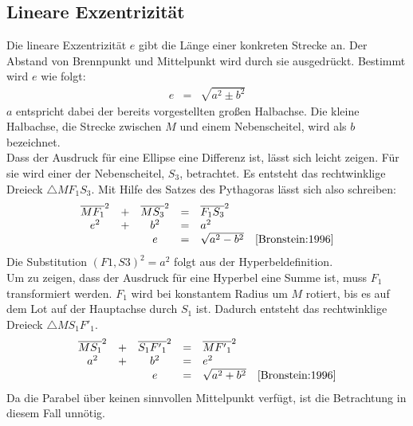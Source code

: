 \subsection{Lineare Exzentrizität}
Die lineare Exzentrizität $e$ gibt die Länge einer konkreten Strecke an. Der Abstand von Brennpunkt und Mittelpunkt wird durch sie ausgedrückt. Bestimmt wird $e$ wie folgt:
\begin{displaymath}
	\begin{array}{rcl}
		e & = & \sqrt{a^2\pm b^2}
	\end{array}
\end{displaymath}
$a$ entspricht dabei der bereits vorgestellten großen Halbachse. Die kleine Halbachse, die Strecke zwischen $M$ und einem Nebenscheitel, wird als $b$ bezeichnet.\\
Dass der Ausdruck für eine Ellipse eine Differenz ist, lässt sich leicht zeigen\cite[S.11]{Scheid:1985}. Für sie wird einer der Nebenscheitel, ${S}_3$, betrachtet. Es entsteht das rechtwinklige Dreieck $\triangle M{F}_1{S}_3$. Mit Hilfe des Satzes des Pythagoras lässt sich also schreiben:
\begin{displaymath}
	\begin{array}{ccccll}
		\overline{M{F}_1}^2 & + & \overline{M{S}_3}^2 & = & \overline{{F}_1{S}_3}^2 &\\
		e^2 & + & b^2 & = & a^2 &\\
		&& e & = & \sqrt{a^2-b^2} & \text{\cite[S.19]{Bronstein:1996}}
	\end{array}
\end{displaymath}
Die Substitution $(F1,S3)^2 = a^2$ folgt aus der Hyperbeldefinition.\\
Um zu zeigen\cite[S.44f]{Scheid:1985}, dass der Ausdruck für eine Hyperbel eine Summe ist, muss ${F}_1$ transformiert werden. ${F}_1$ wird bei konstantem Radius um $M$ rotiert, bis es auf dem Lot auf der Hauptachse durch ${S}_1$ ist. Dadurch entsteht das rechtwinklige Dreieck $\triangle M{S}_1{F'}_1$.
\begin{displaymath}
	\begin{array}{ccccll}
		\overline{M{S}_1}^2 & + & \overline{{S}_1{F'}_1}^2 & = & \overline{M{F'}_1}^2 &\\
		a^2 & + & b^2 & = & e^2 &\\
		&& e & = & \sqrt{a^2+b^2} & \text{\cite[S.21]{Bronstein:1996}}
	\end{array}
\end{displaymath}
Da die Parabel über keinen sinnvollen Mittelpunkt verfügt, ist die Betrachtung in diesem Fall unnötig.\\
